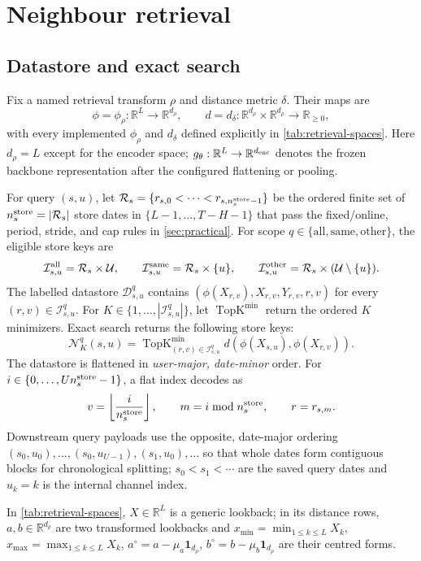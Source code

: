 \documentclass[10pt]{article}
\newcommand{\reals}{\mathbb{R}}
\newcommand{\TopK}{\operatorname{TopK}}
\begin{document}
\section{Neighbour retrieval}
\label{sec:retrieval}

\subsection{Datastore and exact search}

Fix a named retrieval transform $\rho$ and distance metric $\delta$. Their
maps are
\[
 \phi=\phi_\rho:\reals^L\to\reals^{d_\rho},
 \qquad
 d=d_\delta:\reals^{d_\rho}\times\reals^{d_\rho}\to\reals_{\geq0},
\]
with every implemented $\phi_\rho$ and $d_\delta$ defined explicitly in
\cref{tab:retrieval-spaces}. Here $d_\rho=L$ except for the encoder space;
$g_\theta:\reals^L\to\reals^{d_{\rm enc}}$ denotes the frozen backbone
representation after the configured flattening or pooling.

For query $(s,u)$, let
$\mathcal R_s=\{r_{s,0}<\cdots<r_{s,n_s^{\rm store}-1}\}$ be the ordered finite
set of $n_s^{\rm store}=|\mathcal R_s|$ store dates in
$\{L-1,\ldots,T-H-1\}$ that pass the fixed/online, period, stride, and cap
rules in \cref{sec:practical}. For scope
$q\in\{\mathrm{all},\mathrm{same},\mathrm{other}\}$, the eligible store keys are
\[
 \mathcal I^{\rm all}_{s,u}=\mathcal R_s\times\mathcal U,\qquad
 \mathcal I^{\rm same}_{s,u}=\mathcal R_s\times\{u\},\qquad
 \mathcal I^{\rm other}_{s,u}=\mathcal R_s\times(\mathcal U\setminus\{u\}).
\]
The labelled datastore $\mathcal D^q_{s,u}$ contains
$(\phi(X_{r,v}),X_{r,v},Y_{r,v},r,v)$ for every
$(r,v)\in\mathcal I^q_{s,u}$.
For $K\in\{1,\ldots,|\mathcal I^q_{s,u}|\}$, let $\TopK^{\min}$ return the ordered
$K$ minimizers. Exact search returns the following store keys:
\[
 \mathcal N^q_K(s,u)
 =\TopK_{(r,v)\in\mathcal I^q_{s,u}}^{\min}
 d\!\left(\phi(X_{s,u}),\phi(X_{r,v})\right).
\]
The datastore is flattened in \emph{user-major, date-minor} order. For
$i\in\{0,\ldots,Un_s^{\rm store}-1\}$, a flat index decodes as
\[
 v=\left\lfloor\frac{i}{n_s^{\rm store}}\right\rfloor,
 \qquad m=i\bmod n_s^{\rm store},
 \qquad r=r_{s,m}.
\]
Downstream query payloads use the opposite, date-major ordering
$(s_0,u_0),\ldots,(s_0,u_{U-1}),(s_1,u_0),\ldots$ so that whole dates form
contiguous blocks for chronological splitting; $s_0<s_1<\cdots$ are the saved
query dates and $u_k=k$ is the internal channel index.

In \cref{tab:retrieval-spaces}, $X\in\reals^L$ is a generic lookback; in its
distance rows, $a,b\in\reals^{d_\rho}$ are two transformed lookbacks and
$x_{\min}=\min_{1\leq k\leq L}X_k$,
$x_{\max}=\max_{1\leq k\leq L}X_k$,
$a^\circ=a-\mu_a\mathbf1_{d_\rho}$,
$b^\circ=b-\mu_b\mathbf1_{d_\rho}$ are their centred forms.
\end{document}
